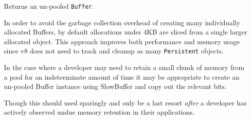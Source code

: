 Returns an un-pooled \texttt{Buffer}.

In order to avoid the garbage collection overhead of creating many
individually allocated Buffers, by default allocations under 4KB are
sliced from a single larger allocated object. This approach improves
both performance and memory usage since v8 does not need to track and
cleanup as many \texttt{Persistent} objects.

In the case where a developer may need to retain a small chunk of memory
from a pool for an indeterminate amount of time it may be appropriate to
create an un-pooled Buffer instance using SlowBuffer and copy out the
relevant bits.

\begin{Shaded}
\begin{Highlighting}[]
 

\NormalTok{(}\NormalTok{, }\NormalTok{() \{}
   \NormalTok{();}
    \NormalTok{(}\NormalTok{);}
  \NormalTok{, }\NormalTok{, }\NormalTok{);}
\NormalTok{\});}
\end{Highlighting}
\end{Shaded}

Though this should used sparingly and only be a last resort \emph{after}
a developer has actively observed undue memory retention in their
applications.
